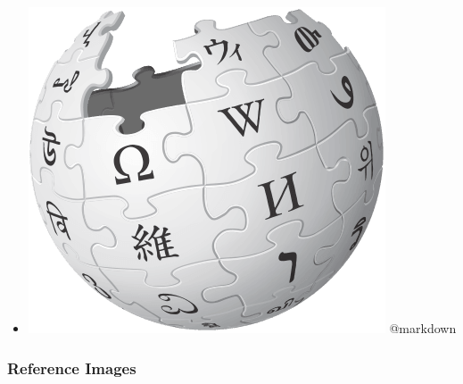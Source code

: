 \documentclass[]{article}
\providecommand{\tightlist}{%
  \setlength{\itemsep}{0pt}\setlength{\parskip}{0pt}}
\begin{document}
\begin{itemize}
\tightlist
\item
  \includegraphics{image.png} @markdown
\end{itemize}

\subsubsection{Reference Images}\label{reference-images}
\end{document}
